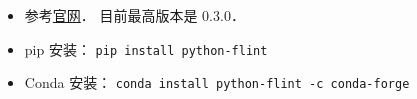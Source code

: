 
\begin{issues}
\issueDraft
\end{issues}

\begin{itemize}
\item 参考\href{https://fredrikj.net/python-flint/}{官网}． 目前最高版本是 0.3.0．
\item pip 安装： \verb|pip install python-flint|
\item Conda 安装： \verb|conda install python-flint -c conda-forge|
\end{itemize}
